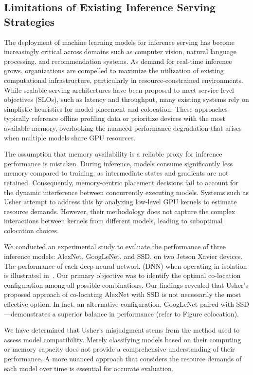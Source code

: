 \subsection{Limitations of Existing Inference Serving Strategies}

The deployment of machine learning models for inference serving has become increasingly critical across domains such as computer vision, natural language processing, and recommendation systems. As demand for real-time inference grows, organizations are compelled to maximize the utilization of existing computational infrastructure, particularly in resource-constrained environments. While scalable serving architectures have been proposed to meet service level objectives (SLOs), such as latency and throughput, many existing systems rely on simplistic heuristics for model placement and colocation. These approaches typically reference offline profiling data or prioritize devices with the most available memory, overlooking the nuanced performance degradation that arises when multiple models share GPU resources.

The assumption that memory availability is a reliable proxy for inference performance is mistaken. During inference, models consume significantly less memory compared to training, as intermediate states and gradients are not retained. Consequently, memory-centric placement decisions fail to account for the dynamic interference between concurrently executing models. Systems such as Usher attempt to address this by analyzing low-level GPU kernels to estimate resource demands. However, their methodology does not capture the complex interactions between kernels from different models, leading to suboptimal colocation choices.

We conducted an experimental study to evaluate the performance of three inference models: AlexNet, GoogLeNet, and SSD, on two Jetson Xavier devices. The performance of each deep neural network (DNN) when operating in isolation is illustrated in~. Our primary objective was to identify the optimal co-location configuration among all possible combinations. Our findings revealed that Usher's proposed approach of co-locating AlexNet with SSD is not necessarily the most effective option. In fact, an alternative configuration, GoogLeNet paired with SSD—demonstrates a superior balance in performance (refer to Figure colocation).

We have determined that Usher's misjudgment stems from the method used to assess model compatibility. Merely classifying models based on their computing or memory capacity does not provide a comprehensive understanding of their performance. A more nuanced approach that considers the resource demands of each model over time is essential for accurate evaluation.


